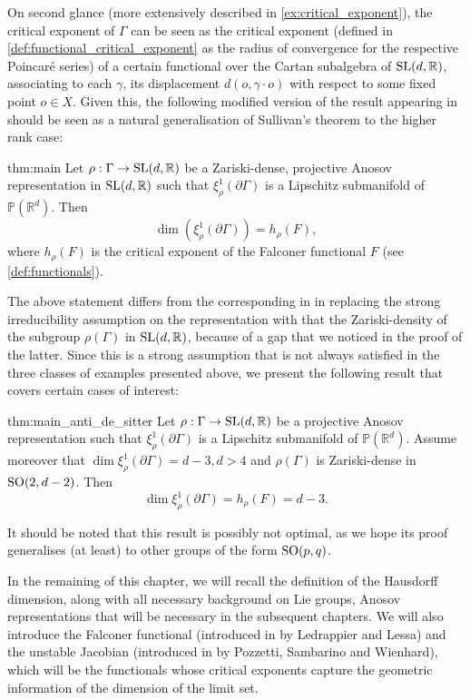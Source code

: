 \documentclass{report}
\begin{document}
On second glance (more extensively described in \cref{ex:critical_exponent}), the critical exponent of $\Gamma$ can be seen as the critical exponent (defined in \cref{def:functional_critical_exponent} as the radius of convergence for the respective Poincaré series) of a certain functional over the Cartan subalgebra of $\operatorname{{\mathrm{SL}}}(d, \mathbb R)$, associating to each $\gamma$, its displacement $d(o, \gamma \cdot o)$ with respect to some fixed point $o \in X$.
Given this, the following modified version of the result appearing in \cite{pozzetti_anosov_2023} should be seen as a natural generalisation of Sullivan's theorem to the higher rank case:
\begin{reptheorem}{thm:main}
    Let $\rho: \Gamma \to \operatorname{{\mathrm{SL}}}(d, \mathbb R)$ be a Zariski-dense, projective Anosov representation in $\operatorname{{\mathrm{SL}}}(d, \mathbb R)$ such that $\xi^1_\rho(\partial \Gamma)$ is a Lipschitz submanifold of $\mathbb P(\mathbb R^d)$.
    Then
    \[
        \dim(\xi^1_\rho(\partial \Gamma)) = h_\rho(F),
    \]
    where $h_\rho(F)$ is the critical exponent of the Falconer functional $F$ (see \cref{def:functionals}).
\end{reptheorem}
The above statement differs from the corresponding in \cite{pozzetti_anosov_2023} in replacing the strong irreducibility assumption on the representation with that the Zariski-density of the subgroup $\rho(\Gamma)$ in $\operatorname{{\mathrm{SL}}}(d, \mathbb R)$, because of a gap that we noticed in the proof of the latter.
Since this is a strong assumption that is not always satisfied in the three classes of examples presented above, we present the following result that covers certain cases of interest:
\begin{reptheorem}{thm:main_anti_de_sitter}
    Let $\rho: \Gamma \to \operatorname{{\mathrm{SL}}}(d, \mathbb R)$ be a projective Anosov representation such that $\xi^1_\rho(\partial \Gamma)$ is a Lipschitz submanifold of $\mathbb P(\mathbb R^d)$.
    Assume moreover that $\dim \xi_\rho^1(\partial \Gamma) = d-3, d > 4$ and $\rho(\Gamma)$ is Zariski-dense in $\operatorname{{\mathrm{SO}}}(2,d-2)$. 
    Then
    \[
        \dim \xi_\rho^1(\partial \Gamma) = h_\rho(F) = d-3.
    \]
\end{reptheorem}
It should be noted that this result is possibly not optimal, as we hope its proof generalises (at least) to other groups of the form $\operatorname{{\mathrm{SO}}}(p,q)$.

In the remaining of this chapter, we will recall the definition of the Hausdorff dimension, along with all necessary background on Lie groups, Anosov representations that will be necessary in the subsequent chapters.
We will also introduce the Falconer functional (introduced in \cite{ledrappier_dimension_2023} by Ledrappier and Lessa) and the unstable Jacobian (introduced in \cite{pozzetti_anosov_2023} by Pozzetti, Sambarino and Wienhard), which will be the functionals whose critical exponents capture the geometric information of the dimension of the limit set.
\end{document}
